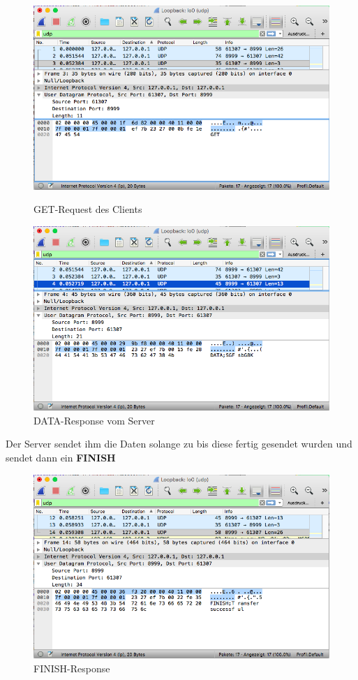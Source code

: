 \begin{figure}[H]
	\begin{minipage}[b]{.5 \linewidth}
		\centering
		\includegraphics[width=.95 \linewidth]{images/w08}
		\caption{GET-Request des Clients}
	\end{minipage}
	\begin{minipage}[b]{.5 \linewidth}
		\centering
		\includegraphics[width=.95 \linewidth]{images/w09}
		\caption{DATA-Response vom Server}
	\end{minipage}
\end{figure}
Der Server sendet ihm die Daten solange zu bis diese fertig gesendet wurden und sendet dann ein \textbf{FINISH}
\begin{figure}[H]
	\centering
	\includegraphics[width=0.6 \linewidth]{images/w10}
	\caption{FINISH-Response} \label{ordner}
\end{figure} 